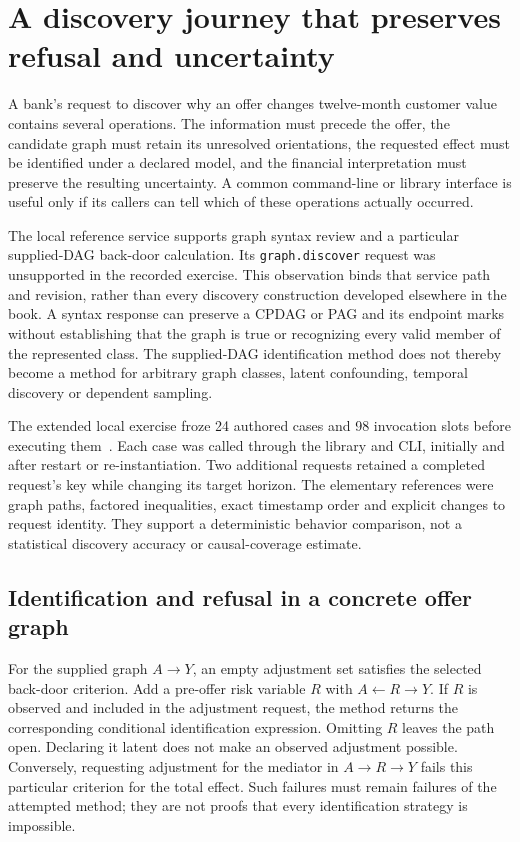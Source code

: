 \section{A discovery journey that preserves refusal and uncertainty}
\label{exec13:discovery-journey}

A bank's request to discover why an offer changes twelve-month customer value
contains several operations. The information must precede the offer, the
candidate graph must retain its unresolved orientations, the requested effect
must be identified under a declared model, and the financial interpretation
must preserve the resulting uncertainty. A common command-line or library
interface is useful only if its callers can tell which of these operations
actually occurred.

The local reference service supports graph syntax review and a particular
supplied-DAG back-door calculation. Its \texttt{graph.discover} request was unsupported in the recorded exercise. This observation binds that service path and revision, rather than every discovery construction developed elsewhere in the book. A syntax response can preserve a CPDAG or PAG and its endpoint
marks without establishing that the graph is true or recognizing every valid
member of the represented class. The supplied-DAG identification method does
not thereby become a method for arbitrary graph classes, latent confounding,
temporal discovery or dependent sampling.

The extended local exercise froze 24 authored cases and 98 invocation slots
before executing them~\citep{exec13_discovery_journey}. Each case was called
through the library and CLI, initially and after restart or re-instantiation.
Two additional requests retained a completed request's key while changing its
target horizon. The elementary references were graph paths, factored
inequalities, exact timestamp order and explicit changes to request identity.
They support a deterministic behavior comparison, not a statistical discovery
accuracy or causal-coverage estimate.

\subsection{Identification and refusal in a concrete offer graph}

For the supplied graph $A\to Y$, an empty adjustment set satisfies the selected
back-door criterion. Add a pre-offer risk variable $R$ with
$A\leftarrow R\to Y$. If $R$ is observed and included in the adjustment
request, the method returns the corresponding conditional identification
expression. Omitting $R$ leaves the path open. Declaring it latent does not
make an observed adjustment possible. Conversely, requesting adjustment for
the mediator in $A\to R\to Y$ fails this particular criterion for the total
effect. Such failures must remain failures of the attempted method; they are
not proofs that every identification strategy is impossible.


